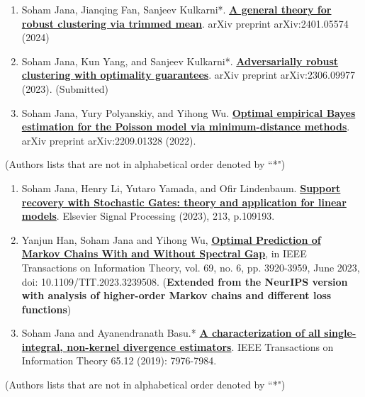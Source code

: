 \documentclass[letterpaper,11pt,oneside]{article}
\theoremstyle{definition}
\begin{document}
		\begin{enumerate}
			\item Soham Jana, Jianqing Fan, Sanjeev Kulkarni*. \href{https://arxiv.org/abs/2401.05574}{\bf A general theory for robust clustering via trimmed mean}. arXiv preprint arXiv:2401.05574 (2024)
			
			\item Soham Jana, Kun Yang, and Sanjeev Kulkarni*. \href{https://arxiv.org/abs/2306.09977}{\bf Adversarially robust clustering with optimality guarantees}. arXiv preprint arXiv:2306.09977 (2023). (Submitted)
			
			\item Soham Jana, Yury Polyanskiy, and Yihong Wu. \href{https://arxiv.org/abs/2209.01328}{\bf Optimal empirical Bayes estimation for the Poisson model via minimum-distance methods}. arXiv preprint arXiv:2209.01328 (2022).
			
		\end{enumerate}
		
		(Authors lists that are not in alphabetical order denoted by ``*")
		
		\begin{enumerate}
			\item Soham Jana, Henry Li, Yutaro Yamada, and Ofir Lindenbaum. {\bf \href{https://www.sciencedirect.com/science/article/abs/pii/S0165168423002670}{\bf Support recovery with Stochastic Gates: theory and application for linear models}}. Elsevier Signal Processing (2023), 213, p.109193.
			
			\item Yanjun Han, Soham Jana and Yihong Wu, \href{https://ieeexplore.ieee.org/abstract/document/10028667}{\bf Optimal Prediction of Markov Chains With and Without Spectral Gap}, in IEEE Transactions on Information Theory, vol. 69, no. 6, pp. 3920-3959, June 2023, doi: 10.1109/TIT.2023.3239508. (\textbf{Extended from the NeurIPS version with analysis of higher-order Markov chains and different loss functions})
			
			\item Soham Jana and Ayanendranath Basu.* \href{https://janasoham.github.io/files/bregman_charac.pdf}{\bf A characterization of all single-integral, non-kernel divergence estimators}. IEEE Transactions on Information Theory 65.12 (2019): 7976-7984.
			
		\end{enumerate}
		
		(Authors lists that are not in alphabetical order denoted by ``*")
		
\end{document}
